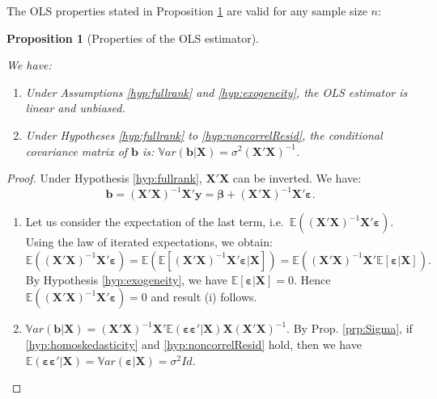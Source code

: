 \documentclass[
  12pt,
]{book}
\providecommand{\tightlist}{%
  \setlength{\itemsep}{0pt}\setlength{\parskip}{0pt}}
\newtheorem{proposition}{Proposition}[chapter]
\theoremstyle{definition}
\theoremstyle{definition}
\theoremstyle{definition}
\theoremstyle{definition}
\theoremstyle{remark}
\begin{document}
The OLS properties stated in Proposition \ref{prp:propOLS} are valid for any sample size \(n\):

\begin{proposition}[Properties of the OLS estimator]
\protect\hypertarget{prp:propOLS}{}\label{prp:propOLS}

We have:

\begin{enumerate}
\def\labelenumi{\roman{enumi}.}
\item
  Under Assumptions \ref{hyp:fullrank} and \ref{hyp:exogeneity}, the OLS estimator is linear and unbiased.
\item
  Under Hypotheses \ref{hyp:fullrank} to \ref{hyp:noncorrelResid}, the conditional covariance matrix of \(\mathbf{b}\) is: \(\mathbb{V}ar(\mathbf{b}|\mathbf{X}) = \sigma^2 (\mathbf{X}'\mathbf{X})^{-1}\).
\end{enumerate}

\end{proposition}

\begin{proof}

Under Hypothesis \ref{hyp:fullrank}, \(\mathbf{X}'\mathbf{X}\) can be inverted. We have:
\[
\mathbf{b} = (\mathbf{X}'\mathbf{X})^{-1} \mathbf{X}'\mathbf{y} = \boldsymbol\beta + (\mathbf{X}'\mathbf{X})^{-1} \mathbf{X}' \mathbf{\varepsilon}.
\]

\begin{enumerate}
\def\labelenumi{\roman{enumi}.}
\tightlist
\item
  Let us consider the expectation of the last term, i.e.~\(\mathbb{E}((\mathbf{X}'\mathbf{X})^{-1} \mathbf{X}' \mathbf{\varepsilon})\). Using the law of iterated expectations, we obtain:
  \[
  \mathbb{E}((\mathbf{X}'\mathbf{X})^{-1} \mathbf{X}' \mathbf{\varepsilon}) = \mathbb{E}(\mathbb{E}[(\mathbf{X}'\mathbf{X})^{-1} \mathbf{X}' \mathbf{\varepsilon}|\mathbf{X}]) = \mathbb{E}((\mathbf{X}'\mathbf{X})^{-1} \mathbf{X}'\mathbb{E}[\mathbf{\varepsilon}|\mathbf{X}]).
  \]
  By Hypothesis \ref{hyp:exogeneity}, we have \(\mathbb{E}[\mathbf{\varepsilon}|\mathbf{X}]=0\). Hence \(\mathbb{E}((\mathbf{X}'\mathbf{X})^{-1} \mathbf{X}' \mathbf{\varepsilon}) =0\) and result (i) follows.
\item
  \(\mathbb{V}ar(\mathbf{b}|\mathbf{X}) = (\mathbf{X}'\mathbf{X})^{-1} \mathbf{X}' \mathbb{E}(\boldsymbol\varepsilon\boldsymbol\varepsilon'|\mathbf{X}) \mathbf{X} (\mathbf{X}'\mathbf{X})^{-1}\).
  By Prop. \ref{prp:Sigma}, if \ref{hyp:homoskedasticity} and \ref{hyp:noncorrelResid} hold, then we have \(\mathbb{E}(\boldsymbol\varepsilon\boldsymbol\varepsilon'|\mathbf{X})=\mathbb{V}ar(\boldsymbol\varepsilon|\mathbf{X})=\sigma^2 Id\).
\end{enumerate}

\end{proof}
\end{document}
